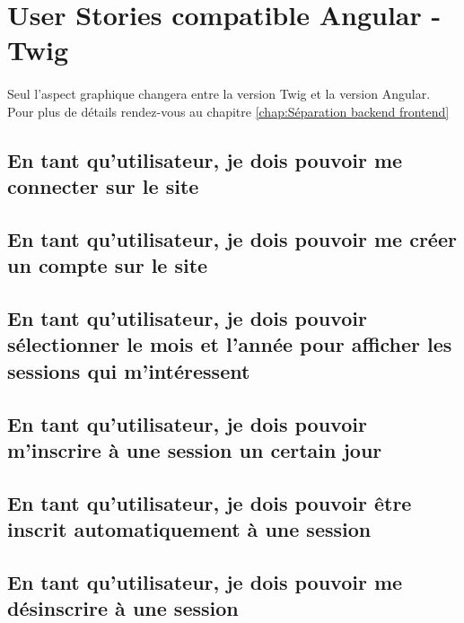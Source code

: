 \section{User Stories compatible Angular - Twig}
	\paragraph{}
		Seul l'aspect graphique changera entre la version Twig et la version Angular.
		Pour plus de détails rendez-vous au chapitre \ref{chap:Séparation backend frontend}
	
	\subsection{En tant qu’utilisateur, je dois pouvoir me connecter sur le site}
		
	
	\vspace{\baselineskip}
	\subsection{En tant qu’utilisateur, je dois pouvoir me créer un compte sur le site}
		

	\vspace{\baselineskip}
	\subsection{En tant qu'utilisateur, je dois pouvoir sélectionner le mois et l'année pour afficher les sessions qui m'intéressent}
		
	
	\newpage
	\subsection{En tant qu’utilisateur, je dois pouvoir m’inscrire à une session un certain jour}
		

	\newpage
	\subsection{En tant qu’utilisateur, je dois pouvoir être inscrit automatiquement à une session}
		
	
	\vspace{\baselineskip}
	\subsection{En tant qu’utilisateur, je dois pouvoir me désinscrire à une session}
		

